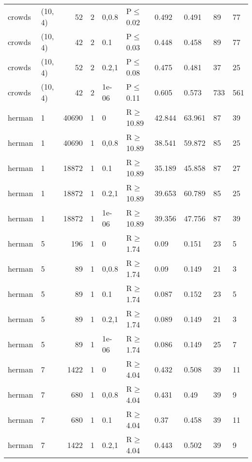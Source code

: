 \begin{longtable}{llrrllllll}
 crowds        & (10, 4)  &     	52 &   2 & 0,0.8 & P$\leq$0.02  & 0.492   & 0.491   & 89      & 77   \\
 crowds        & (10, 4)  &     	42 &   2 & 0.1   & P$\leq$0.03  & 0.448   & 0.458   & 89      & 77   \\
 crowds        & (10, 4)  &     	52 &   2 & 0.2,1 & P$\leq$0.08  & 0.475   & 0.481   & 37      & 25   \\
 crowds        & (10, 4)  &     	42 &   2 & 1e-06 & P$\leq$0.11  & 0.605   & 0.573   & 733     & 561  \\
 herman        & 1        &  	40690 &   1 & 0     & R$\geq$10.89 & 42.844  & 63.961  & 87      & 39   \\
 herman        & 1        &  	40690 &   1 & 0,0.8 & R$\geq$10.89 & 38.541  & 59.872  & 85      & 25   \\
 herman        & 1        &  	18872 &   1 & 0.1   & R$\geq$10.89 & 35.189  & 45.858  & 87      & 27   \\
 herman        & 1        &  	18872 &   1 & 0.2,1 & R$\geq$10.89 & 39.653  & 60.789  & 85      & 25   \\
 herman        & 1        &  	18872 &   1 & 1e-06 & R$\geq$10.89 & 39.356  & 47.756  & 87      & 39   \\
 herman        & 5        &    	196 &   1 & 0     & R$\geq$1.74  & 0.09    & 0.151   & 23      & 5    \\
 herman        & 5        &     	89 &   1 & 0,0.8 & R$\geq$1.74  & 0.09    & 0.149   & 21      & 3    \\
 herman        & 5        &     	89 &   1 & 0.1   & R$\geq$1.74  & 0.087   & 0.152   & 23      & 5    \\
 herman        & 5        &     	89 &   1 & 0.2,1 & R$\geq$1.74  & 0.089   & 0.149   & 21      & 3    \\
 herman        & 5        &     	89 &   1 & 1e-06 & R$\geq$1.74  & 0.086   & 0.149   & 25      & 7    \\
 herman        & 7        &   	1422 &   1 & 0     & R$\geq$4.04  & 0.432   & 0.508   & 39      & 11   \\
 herman        & 7        &    	680 &   1 & 0,0.8 & R$\geq$4.04  & 0.431   & 0.49    & 39      & 9    \\
 herman        & 7        &    	680 &   1 & 0.1   & R$\geq$4.04  & 0.37    & 0.458   & 39      & 11   \\
 herman        & 7        &   	1422 &   1 & 0.2,1 & R$\geq$4.04  & 0.443   & 0.502   & 39      & 9    \\

\end{longtable}
